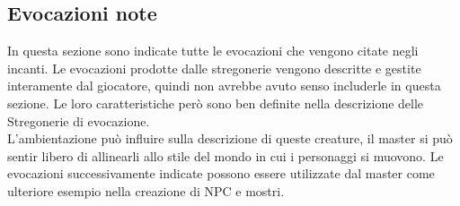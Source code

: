 \documentclass[../manuale_main.tex]{subfiles}
\begin{document}
\clearpage
\subsection{Evocazioni note}
In questa sezione sono indicate tutte le evocazioni che vengono citate negli incanti. Le evocazioni prodotte dalle stregonerie vengono descritte e gestite interamente dal giocatore, quindi non avrebbe avuto senso includerle in questa sezione. Le loro caratteristiche però sono ben definite nella descrizione delle Stregonerie di evocazione.\\
L'ambientazione può influire sulla descrizione di queste creature, il master si può sentir libero di allinearli allo stile del mondo in cui i personaggi si muovono. Le evocazioni successivamente indicate possono essere utilizzate dal master come ulteriore esempio nella creazione di NPC e mostri. \\
\end{document}
